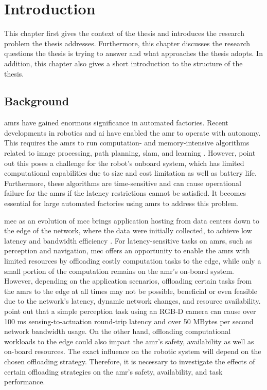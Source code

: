 \chapter{Introduction}

This chapter first gives the context of the thesis and introduces the research problem the thesis addresses. Furthermore, this chapter discusses the research questions the thesis is trying to answer and what approaches the thesis adopts. In addition, this chapter also gives a short introduction to the structure of the thesis.

\section{Background}

\glspl{amr} have gained enormous significance in automated factories. Recent developments in robotics and \gls{ai} have enabled the \gls{amr} to operate with autonomy. This requires the \glspl{amr} to run computation- and memory-intensive algorithms related to image processing, path planning, \gls{slam}, and learning \cite{Saeik2021}. However, \citeauthor*{Baxi2022} point out this poses a challenge for the robot's onboard system, which has limited computational capabilities due to size and cost limitation as well as battery life. Furthermore, these algorithms are time-sensitive and can cause operational failure for the \glspl{amr} if the latency restrictions cannot be satisfied. It becomes essential for large automated factories using \glspl{amr} to address this problem. 


\gls{mec} as an evolution of \gls*{mcc} brings application hosting from data centers down to the edge of the network, where the data were initially collected, to achieve low latency and bandwidth efficiency \cite{Lin2019}. For latency-sensitive tasks on \glspl{amr}, such as perception and navigation, \gls{mec} offers an opportunity to enable the \glspl{amr} with limited resources by offloading costly computation tasks to the edge, while only a small portion of the computation remains on the \gls{amr}'s on-board system. However, depending on the application scenarios, offloading certain tasks from the \glspl{amr} to the edge at all times may not be possible, beneficial or even feasible due to the network's latency, dynamic network changes, and resource availability. \citeauthor*{Baxi2022} point out that a simple perception task using an RGB-D camera can cause over 100 ms sensing-to-actuation round-trip latency and over 50 MBytes per second network bandwidth usage. On the other hand, offloading computational workloads to the edge could also impact the \gls{amr}'s safety, availability as well as on-board resources. The exact influence on the robotic system will depend on the chosen offloading strategy. Therefore, it is necessary to investigate the effects of certain offloading strategies on the \gls{amr}'s safety, availability, and task performance.

